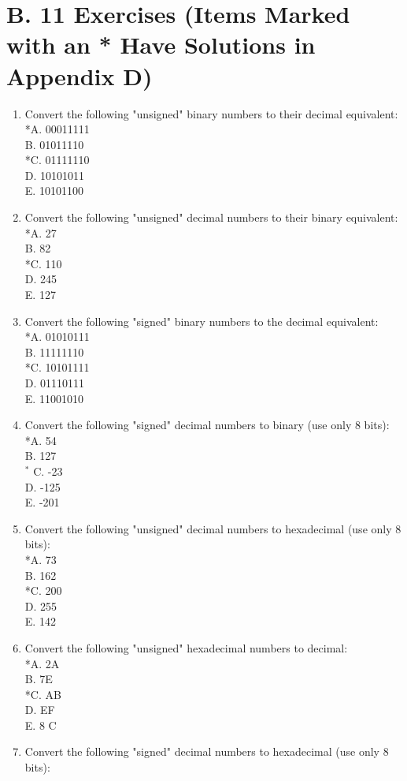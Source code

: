 \documentclass[10pt]{article}
\begin{document}
\section*{B. 11 Exercises (Items Marked with an * Have Solutions in Appendix D)}
\begin{enumerate}
  \item Convert the following "unsigned" binary numbers to their decimal equivalent:\\
*A. 00011111\\
B. 01011110\\
*C. 01111110\\
D. 10101011\\
E. 10101100
  \item Convert the following "unsigned" decimal numbers to their binary equivalent:\\
*A. 27\\
B. 82\\
*C. 110\\
D. 245\\
E. 127
  \item Convert the following "signed" binary numbers to the decimal equivalent:\\
*A. 01010111\\
B. 11111110\\
*C. 10101111\\
D. 01110111\\
E. 11001010
  \item Convert the following "signed" decimal numbers to binary (use only 8 bits):\\
*A. 54\\
B. 127\\
${ }^{*}$ C. -23\\
D. -125\\
E. -201
  \item Convert the following "unsigned" decimal numbers to hexadecimal (use only 8 bits):\\
*A. 73\\
B. 162\\
*C. 200\\
D. 255\\
E. 142
  \item Convert the following "unsigned" hexadecimal numbers to decimal:\\
*A. 2A\\
B. 7E\\
*C. AB\\
D. EF\\
E. 8 C
  \item Convert the following "signed" decimal numbers to hexadecimal (use only 8 bits):\\

\end{enumerate}
\end{document}
